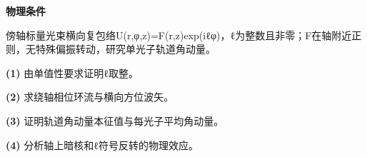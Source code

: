\textbf{物理条件}\par 傍轴标量光束横向复包络U(r,φ,z)=F(r,z)exp(iℓφ)，ℓ为整数且非零；F在轴附近正则，无特殊偏振转动，研究单光子轨道角动量。
\par\noindent\textbf{(1)} 由单值性要求证明ℓ取整。
\par\noindent\textbf{(2)} 求绕轴相位环流与横向方位波矢。
\par\noindent\textbf{(3)} 证明轨道角动量本征值与每光子平均角动量。
\par\noindent\textbf{(4)} 分析轴上暗核和ℓ符号反转的物理效应。
